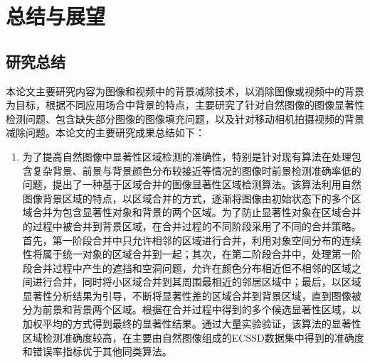\chapter{总结与展望}
\label{ch6:Summary}

\section{研究总结}
\label{ch6:sec:summary}
本论文主要研究内容为图像和视频中的背景减除技术，以消除图像或视频中的背景为目标，根据不同应用场合中背景的特点，主要研究了针对自然图像的图像显著性检测问题、包含缺失部分图像的图像填充问题，以及针对移动相机拍摄视频的背景减除问题。本论文的主要研究成果总结如下：
\begin{enumerate}
  \item 为了提高自然图像中显著性区域检测的准确性，特别是针对现有算法在处理包含复杂背景、前景与背景颜色分布较接近等情况的图像时前景检测准确率低的问题，提出了一种基于区域合并的图像显著性区域检测算法。该算法利用自然图像背景区域的特点，以区域合并的方式，逐渐将图像由初始状态下的多个区域合并为包含显著性对象和背景的两个区域。为了防止显著性对象在区域合并的过程中被合并到背景区域，在合并过程的不同阶段采用了不同的合并策略。首先，第一阶段合并中只允许相邻的区域进行合并，利用对象空间分布的连续性将属于统一对象的区域合并到一起；其次，在第二阶段合并中，处理第一阶段合并过程中产生的遮挡和空洞问题，允许在颜色分布相近但不相邻的区域之间进行合并，同时将小区域合并到其周围最相近的邻居区域中；最后，以区域显著性分析结果为引导，不断将显著性差的区域合并到背景区域，直到图像被分为前景和背景两个区域。根据在合并过程中得到的多个候选显著性区域，以加权平均的方式得到最终的显著性结果。通过大量实验验证，该算法的显著性区域检测准确度较高，在主要由自然图像组成的ECSSD数据集中得到的准确度和错误率指标优于其他同类算法。


\end{enumerate}
